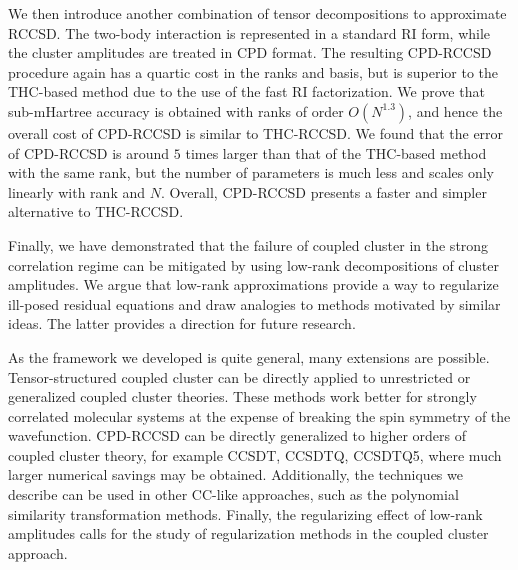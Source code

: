 We then introduce another combination of tensor decompositions to approximate 
RCCSD. The two-body interaction is represented in a standard RI form, 
while the cluster amplitudes are treated in CPD format. The resulting CPD-RCCSD 
procedure again has a quartic cost in the ranks and basis, but is 
superior to the THC-based method due to the use of the fast RI factorization. We 
prove that sub-mHartree accuracy is obtained with ranks of order 
$O(N^{1.3})$, and hence the overall cost of CPD-RCCSD is similar to THC-RCCSD. 
We found that the error of CPD-RCCSD is around $5$ times larger than that of 
the THC-based method with the same rank, but the number of parameters is much 
less and scales only linearly with rank and $N$. Overall, CPD-RCCSD presents a 
faster and simpler alternative to THC-RCCSD. 

Finally, we have demonstrated that the failure of coupled cluster in the strong 
correlation regime can be mitigated by using low-rank decompositions of 
cluster amplitudes. We argue that low-rank approximations provide a way to 
regularize ill-posed residual equations and draw analogies to methods 
motivated by similar ideas. The latter provides a direction for future 
research.

As the framework we developed is quite general, many extensions are possible. 
Tensor-structured coupled cluster can be directly applied to unrestricted or 
generalized coupled cluster theories. These methods work better for strongly 
correlated molecular systems at the expense of breaking the spin symmetry of 
the wavefunction. CPD-RCCSD can be directly generalized to higher orders of 
coupled cluster theory, for example CCSDT, CCSDTQ, CCSDTQ5, where much larger 
numerical savings may be obtained. Additionally, the techniques we describe 
can be used in other CC-like approaches, such as the polynomial 
similarity transformation methods.\cite{degroote2016polynomial, 
gomez2017attenuated} Finally, the regularizing effect of 
low-rank amplitudes calls for the study of regularization methods in the 
coupled cluster approach.
